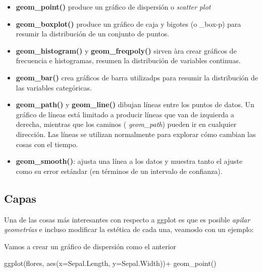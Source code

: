 \documentclass[
]{book}
\newenvironment{Shaded}{\begin{snugshade}}{\end{snugshade}}
\newcommand{\AttributeTok}[1]{\textcolor[rgb]{0.77,0.63,0.00}{#1}}
\newcommand{\FunctionTok}[1]{\textcolor[rgb]{0.00,0.00,0.00}{#1}}
\newcommand{\NormalTok}[1]{#1}
\newcommand{\SpecialCharTok}[1]{\textcolor[rgb]{0.00,0.00,0.00}{#1}}
\begin{document}
\begin{itemize}
\item
  \textbf{geom\_point()} produce un gráfico de dispersión o \emph{scatter plot}
\item
  \textbf{geom\_boxplot()} produce un gráfico de caja y bigotes (o \_box-p) para resumir la distribución de un conjunto de puntos.
\item
  \textbf{geom\_histogram()} y \textbf{geom\_freqpoly()} sirven àra crear gráficos de frecuencia e histogramas, resumen la distribución de variables continuas.
\item
  \textbf{geom\_bar()} crea gráficos de barra utilizadps para resumir la distribución de las variables categóricas.
\item
  \textbf{geom\_path()} y \textbf{geom\_line()} dibujan líneas entre los puntos de datos. Un gráfico de líneas está limitado a producir líneas que van de izquierda a derecha, mientras que los caminos ( \emph{geom\_path}) pueden ir en cualquier dirección. Las líneas se utilizan normalmente para explorar cómo cambian las cosas con el tiempo.
\item
  \textbf{geom\_smooth()}: ajusta una línea a los datos y muestra tanto el ajuste como su error estándar (en términos de un intervalo de confianza).
\end{itemize}

\hypertarget{capas}{%
\subsection{Capas}\label{capas}}

Una de las cosas más interesantes con respecto a ggplot es que es posible \emph{apilar geometrías} e incluso modificar la estética de cada una, veamoslo con un ejemplo:

Vamos a crear un gráfico de dispersión como el anterior

\begin{Shaded}
\begin{Highlighting}[]
\FunctionTok{ggplot}\NormalTok{(flores, }\FunctionTok{aes}\NormalTok{(}\AttributeTok{x=}\NormalTok{Sepal.Length, }\AttributeTok{y=}\NormalTok{Sepal.Width))}\SpecialCharTok{+}
  \FunctionTok{geom\_point}\NormalTok{()}
\end{Highlighting}
\end{Shaded}
\end{document}
